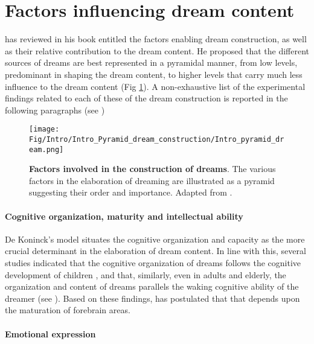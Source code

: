\section{Factors influencing dream content}
\label{sec:dream-content:factors}

\citet{de_koninck_sleep_2012} has reviewed in his book entitled  the factors enabling dream construction, as well as their relative contribution to the dream content. He proposed that the different sources of dreams are best represented in a pyramidal manner, from low levels, predominant in shaping the dream content, to higher levels that carry much less influence to the dream content (Fig \ref{fig:intro:koninck}). A non-exhaustive list of the experimental findings related to each of these  of the dream construction is reported in the following paragraphs (see \citealp{blagrove_trait_2010, schredl_characteristics_2010, ruby_experimental_2011, de_koninck_sleep_2012})

\begin{figure}[htb]
	\centering
	\texttt{[image: Fig/Intro/Intro\_Pyramid\_dream\_construction/Intro\_pyramid\_dream.png]}
	\caption[Factors involved in the construction of dreams]{\textbf{Factors involved in the construction of dreams}. The various factors in the elaboration of dreaming are illustrated as a pyramid suggesting their order and importance. Adapted from \citet{de_koninck_sleep_2012}.}
	\label{fig:intro:koninck}
\end{figure}


\paragraph{Cognitive organization, maturity and intellectual ability}

De Koninck's model situates the cognitive organization and capacity as the more crucial determinant in the elaboration of dream content. In line with this, several studies indicated that the cognitive organization of dreams follows the cognitive development of children \citep{foulkes_childrens_1982, foulkes_rem_1990}, and that, similarly, even in adults and elderly, the organization and content of dreams parallels the waking cognitive ability of the dreamer (see \citealp{cavallero_dreaming_1993}). Based on these findings, \citet{domhoff_new_2001} has postulated that  that depends upon the maturation of forebrain areas.

\paragraph{Emotional expression}

